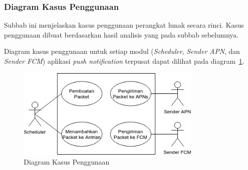 \subsubsection{Diagram Kasus Penggunaan}
\par Subbab ini menjelaskan kasus penggunaan perangkat lunak secara rinci. Kasus penggunaan dibuat berdasarkan hasil analisis yang pada subbab sebelumnya.
\par Diagram kasus penggunaan untuk setiap modul (\textit{Scheduler}, \textit{Sender APN}, dan \textit{Sender FCM}) aplikasi \textit{push notification} terpusat dapat dilihat pada diagram~\ref{diagram_kasus_penggunaan}.
\begin{figure}[H]
    \centering\includegraphics[width=0.8\textwidth]{bab3/figures/diagram_kasus_penggunaan.jpg}
    \caption{Diagram Kasus Penggunaan}
    \label{diagram_kasus_penggunaan}
\end{figure}

\newcommand\tableUcDesc[7] {
\begin{longtable}{|p{2.5cm}|p{6.5cm}|}
    \hline
    \textbf{Komponen} & \textbf{Deskripsi} \\ \hline
    Kode & #1 \\ \hline
    Nama & #2 \\ \hline
    Deskripsi & #3 \\ \hline
    Aktor & #4 \\ \hline
    Kondisi Awal & #5 \\ \hline
    Kondisi Akhir & #6 \\ \hline
    Alur Normal & #7 \\ \hline
    \caption{Kasus Penggunaan #2}
\end{longtable}
}

